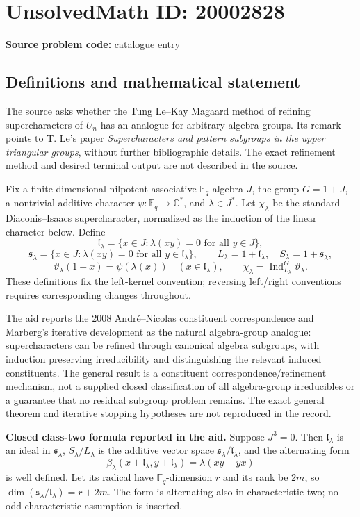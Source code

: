 \documentclass[11pt]{article}
\newcommand{\C}{\mathbb{C}}
\newcommand{\F}{\mathbb{F}}
\begin{document}
\section*{UnsolvedMath ID: 20002828}
\textbf{Source problem code:} catalogue entry
\subsection{Definitions and mathematical statement}
The source asks whether the Tung Le--Kay Magaard method of refining supercharacters of \(U_n\) has an analogue for arbitrary algebra groups. Its remark points to T. Le's paper \emph{Supercharacters and pattern subgroups in the upper triangular groups}, without further bibliographic details. The exact refinement method and desired terminal output are not described in the source.

Fix a finite-dimensional nilpotent associative \(\F_q\)-algebra \(J\), the group \(G=1+J\), a nontrivial additive character \(\psi:\F_q\to\C^*\), and \(\lambda\in J^*\). Let \(\chi_\lambda\) be the standard Diaconis--Isaacs supercharacter, normalized as the induction of the linear character below. Define
\[
 \mathfrak l_\lambda=\{x\in J:\lambda(xy)=0\text{ for all }y\in J\},
\]
\[
 \mathfrak s_\lambda=\{x\in J:\lambda(xy)=0\text{ for all }y\in\mathfrak l_\lambda\},
 \qquad L_\lambda=1+\mathfrak l_\lambda,\quad
 S_\lambda=1+\mathfrak s_\lambda,
\]
\[
 \vartheta_\lambda(1+x)=\psi(\lambda(x))\quad(x\in\mathfrak l_\lambda),
 \qquad\chi_\lambda=\operatorname{Ind}_{L_\lambda}^G\vartheta_\lambda.
\]
These definitions fix the left-kernel convention; reversing left/right conventions requires corresponding changes throughout.

The aid reports the 2008 Andr\'e--Nicolas constituent correspondence and Marberg's iterative development as the natural algebra-group analogue: supercharacters can be refined through canonical algebra subgroups, with induction preserving irreducibility and distinguishing the relevant induced constituents. The general result is a constituent correspondence/refinement mechanism, not a supplied closed classification of all algebra-group irreducibles or a guarantee that no residual subgroup problem remains. The exact general theorem and iterative stopping hypotheses are not reproduced in the record.

\textbf{Closed class-two formula reported in the aid.} Suppose \(J^3=0\). Then \(\mathfrak l_\lambda\) is an ideal in \(\mathfrak s_\lambda\), \(S_\lambda/L_\lambda\) is the additive vector space \(\mathfrak s_\lambda/\mathfrak l_\lambda\), and the alternating form
\[
 \beta_\lambda(x+\mathfrak l_\lambda,y+\mathfrak l_\lambda)
             =\lambda(xy-yx)
\]
is well defined. Let its radical have \(\F_q\)-dimension \(r\) and its rank be \(2m\), so \(\dim(\mathfrak s_\lambda/\mathfrak l_\lambda)=r+2m\). The form is alternating also in characteristic two; no odd-characteristic assumption is inserted.
\end{document}
